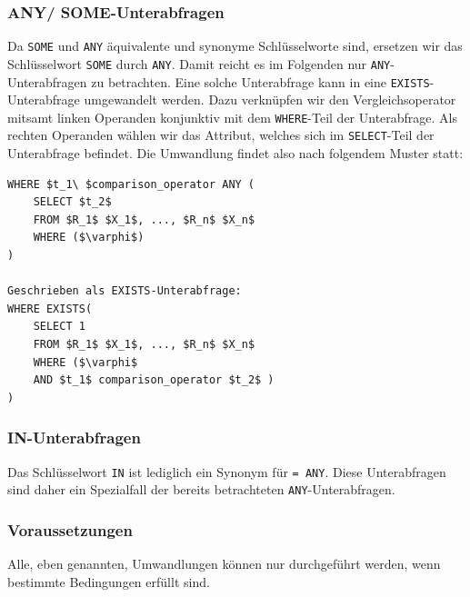 \subsubsection*{ANY/ SOME-Unterabfragen}

Da \verb|SOME| und \verb|ANY| äquivalente und synonyme Schlüsselworte sind, ersetzen wir das Schlüsselwort \verb|SOME| durch \verb|ANY|. Damit reicht es im Folgenden nur \verb|ANY|-Unterabfragen zu betrachten. Eine solche Unterabfrage kann in eine \verb|EXISTS|-Unterabfrage umgewandelt werden. Dazu verknüpfen wir den Vergleichsoperator mitsamt linken Operanden konjunktiv mit dem \verb|WHERE|-Teil der Unterabfrage. Als rechten Operanden wählen wir das Attribut, welches sich im \verb|SELECT|-Teil der Unterabfrage befindet. Die Umwandlung findet also nach folgendem Muster statt:

\begin{lstlisting}[mathescape]
WHERE $t_1\ $comparison_operator ANY (
	SELECT $t_2$
	FROM $R_1$ $X_1$, ..., $R_n$ $X_n$
	WHERE ($\varphi$) 
) 

Geschrieben als EXISTS-Unterabfrage:
WHERE EXISTS( 
	SELECT 1
	FROM $R_1$ $X_1$, ..., $R_n$ $X_n$
	WHERE ($\varphi$ 
	AND $t_1$ comparison_operator $t_2$ )
)
\end{lstlisting}

\subsubsection*{IN-Unterabfragen}

Das Schlüsselwort \verb|IN| ist lediglich ein Synonym für \verb|= ANY|. Diese Unterabfragen sind daher ein Spezialfall der bereits betrachteten \verb|ANY|-Unterabfragen.

\subsubsection*{Voraussetzungen}

Alle, eben genannten, Umwandlungen können nur durchgeführt werden, wenn bestimmte Bedingungen erfüllt sind.


